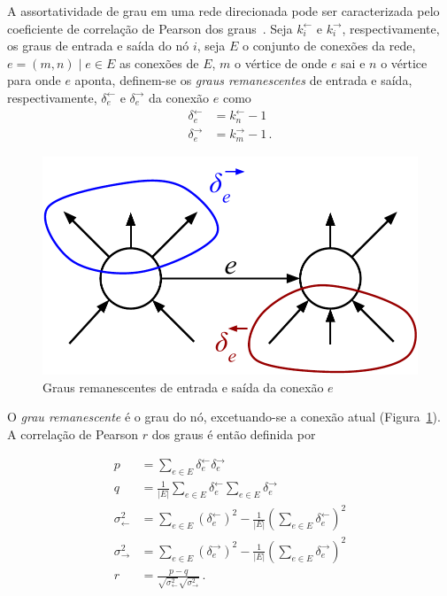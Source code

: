 \documentclass[12pt,a4paper]{article}
\begin{document}
A assortatividade de grau em uma rede direcionada pode ser caracterizada pelo coeficiente de correlação de Pearson dos graus~\cite{Barabasi2016-rn}. Seja $k_i^\leftarrow$ e $k_i^\rightarrow$,  respectivamente, os graus de entrada e saída do nó $i$, seja $E$ o conjunto de conexões da rede, $e = (m, n) \mid e \in E$ as conexões de $E$, $m$ o vértice de onde $e$ sai e $n$ o vértice para onde $e$ aponta, definem-se os \textit{graus remanescentes} de entrada e saída, respectivamente, $\delta_e^\leftarrow$ e $\delta_e^\rightarrow$ da conexão $e$ como
\begin{align*}
\delta_e^\leftarrow &= k_n^\leftarrow - 1
\\
\delta_e^\rightarrow &= k_m^\rightarrow - 1\,.
\end{align*}

\begin{figure}[ht]
    \centering
    \includegraphics[scale=0.4]{remaining-degree.pdf}
    \caption{Graus remanescentes de entrada e saída da conexão $e$}
    \label{fig:remaining-degree}
\end{figure}

O \textit{grau remanescente} é o grau do nó, excetuando-se a conexão atual (Figura~\ref{fig:remaining-degree}). A correlação de Pearson $r$ dos graus é então definida por

\begin{align*}
p &= \sum_{e \in E} \delta_e^\leftarrow \delta_e^\rightarrow
\\
q &= \frac{1}{|E|} \sum_{e \in E} \delta_e^\leftarrow
\sum_{e \in E }\delta_e^\rightarrow
\\
\sigma^2_\leftarrow &= \sum_{e \in E} \left( \delta_e^\leftarrow \right)^2
- \frac{1}{|E|} \left( \sum_{e \in E} \delta_e^\leftarrow \right)^2
\\
\sigma^2_\rightarrow &= \sum_{e \in E} \left( \delta_e^\rightarrow \right)^2
- \frac{1}{|E|} \left( \sum_{e \in E} \delta_e^\rightarrow \right)^2
\\
r &= \frac{p - q}
{\sqrt{ \sigma^2_\leftarrow } \sqrt{ \sigma^2_\rightarrow }}\,.
\end{align*}
\end{document}

